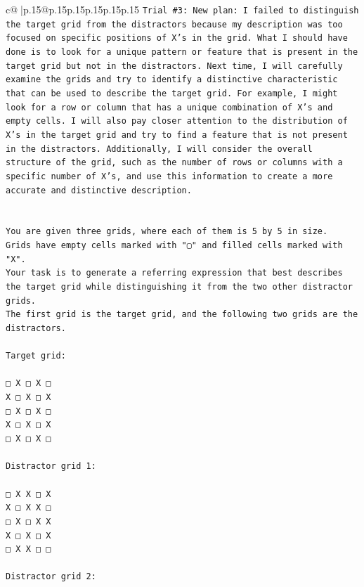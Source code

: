 \documentclass{article}
\begin{document}
{\begin{supertabular}{c@{$\;$}|p{.15\linewidth}@{}p{.15\linewidth}p{.15\linewidth}p{.15\linewidth}p{.15\linewidth}p{.15\linewidth}}
{{{\texttt{Trial \#3: New plan: I failed to distinguish the target grid from the distractors because my description was too focused on specific positions of X's in the grid. What I should have done is to look for a unique pattern or feature that is present in the target grid but not in the distractors. Next time, I will carefully examine the grids and try to identify a distinctive characteristic that can be used to describe the target grid. For example, I might look for a row or column that has a unique combination of X's and empty cells. I will also pay closer attention to the distribution of X's in the target grid and try to find a feature that is not present in the distractors. Additionally, I will consider the overall structure of the grid, such as the number of rows or columns with a specific number of X's, and use this information to create a more accurate and distinctive description.} \\
\\ 
\\ 
\texttt{You are given three grids, where each of them is 5 by 5 in size.} \\
\texttt{Grids have empty cells marked with "▢" and filled cells marked with "X".} \\
\texttt{Your task is to generate a referring expression that best describes the target grid while distinguishing it from the two other distractor grids.} \\
\texttt{The first grid is the target grid, and the following two grids are the distractors.} \\
\\ 
\texttt{Target grid:} \\
\\ 
\texttt{□ X □ X □} \\
\texttt{X □ X □ X} \\
\texttt{□ X □ X □} \\
\texttt{X □ X □ X} \\
\texttt{□ X □ X □} \\
\\ 
\texttt{Distractor grid 1:} \\
\\ 
\texttt{□ X X □ X} \\
\texttt{X □ X X □} \\
\texttt{□ X □ X X} \\
\texttt{X □ X □ X} \\
\texttt{□ X X □ □} \\
\\ 
\texttt{Distractor grid 2:} \\
}}}
\end{supertabular}}
\end{document}
